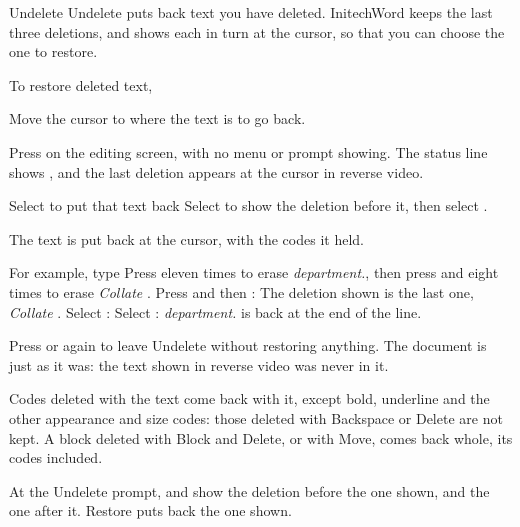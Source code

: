 \begin{Feature}{Undelete}
Undelete puts back text you have deleted.  InitechWord keeps the last three
deletions, and shows each in turn at the cursor, so that you can choose the
one to restore.

To restore deleted text,
\begin{WPSteps}
\item Move the cursor to where the text is to go back.
\item Press  on the editing screen, with no menu or prompt
showing.  The status line shows , and the last deletion appears at the cursor in reverse video.
\item Select  to put that text back
\Or
Select  to show the deletion before it, then
select .
\end{WPSteps}
The text is put back at the cursor, with the codes it held.

For example, type 
Press  eleven times
to erase \textit{department.}, then press  and
 eight times
to erase \textit{Collate }.  Press  and then
:
The deletion shown is the last one, \textit{Collate }.  Select
:
Select : \textit{department.} is back at the end of the
line.
\EndReplay

\Notes
{}
Press  or  again to leave Undelete without restoring
anything.  The document is just as it was: the text shown in reverse video
was never in it.

Codes deleted with the text come back with it, except bold, underline and
the other appearance and size codes: those deleted with Backspace or Delete
are not kept.  A block deleted with Block and Delete, or with Move, comes
back whole, its codes included.

At the Undelete prompt,  and  show the
deletion before the one shown, and  the one after it.  Restore puts
back the one shown.


\end{Feature}
